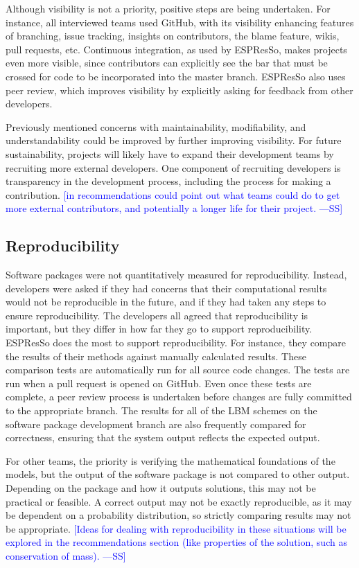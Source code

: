 \documentclass[final, 3p, times, authoryear]{elsarticle}
\newcommand{\authornote}[3]{\textcolor{#1}{[#3 ---#2]}}
\newcommand{\authornote}[3]{}
\newcommand{\wss}[1]{\authornote{blue}{SS}{#1}} %
\begin{document}
Although visibility is not a priority, positive steps are being undertaken. For
instance, all interviewed teams used GitHub, with its visibility enhancing
features of branching, issue tracking, insights on contributors, the blame
feature, wikis, pull requests, etc. Continuous integration, as used by ESPResSo,
makes projects even more visible, since contributors can explicitly see the bar
that must be crossed for code to be incorporated into the master branch.
ESPResSo also uses peer review, which improves visibility by explicitly asking
for feedback from other developers.

Previously mentioned concerns with maintainability, modifiability, and
understandability  could be improved by further improving visibility.  For
future sustainability, projects will likely have to expand their development
teams by recruiting more external developers. One component of recruiting
developers is transparency in the development process, including the process for
making a contribution.  \wss{in recommendations could point out what teams could
do to get more external contributors, and potentially a longer life for their
project.}

\subsection{Reproducibility}

Software packages were not quantitatively measured for reproducibility. Instead,
developers were asked if they had concerns that their computational results
would not be reproducible in the future, and if they had taken any steps to
ensure reproducibility.  The developers all agreed that reproducibility is
important, but they differ in how far they go to support reproducibility.
ESPResSo does the most to support reproducibility.  For instance, they compare
the results of their methods against manually calculated results. These
comparison tests are automatically run for all source code changes. The tests
are run when a pull request is opened on GitHub. Even once these tests are
complete, a peer review process is undertaken before changes are fully committed
to the appropriate branch. The results for all of the LBM schemes on the
software package development branch are also frequently compared for
correctness, ensuring that the system output reflects the expected output.  

For other teams, the priority is verifying the mathematical foundations of the
models, but the output of the software package is not compared to other output.
Depending on the package and how it outputs solutions, this may not be practical
or feasible. A correct output may not be exactly reproducible, as it may be
dependent on a probability distribution, so strictly comparing results may not
be appropriate. \wss{Ideas for dealing with reproducibility in these situations
will be explored in the recommendations section (like properties of the solution,
such as conservation of mass).}
\end{document}
